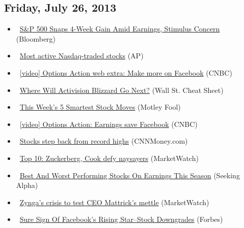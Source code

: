\documentclass[11pt,asymmetric]{article}
\begin{document}
\subsection*{Friday, July 26, 2013}
\begin{itemize}
\item\ \href{http://www.bloomberg.com/news/2013-07-26/s-p-500-snaps-4-week-gain-amid-earnings-stimulus-concern.html?cmpid=yhoo}{S\&P 500 Snaps 4-Week Gain Amid Earnings, Stimulus Concern} (Bloomberg)
\item\ \href{http://finance.yahoo.com/news/most-active-nasdaq-traded-stocks-174218975.html}{Most active Nasdaq-traded stocks} (AP)
\item\ \href{http://video.cnbc.com/gallery/?video=3000185984&__source=yahoo%7Cheadline%7Cquote%7Cvideo%7C&par=yahoo}{[video] Options Action web extra: Make more on Facebook} (CNBC)
\item\ \href{http://wallstcheatsheet.com/stocks/where-will-activision-blizzard-go-next.html/?ref=YF}{Where Will Activision Blizzard Go Next?} (Wall St. Cheat Sheet)
\item\ \href{http://www.fool.com/investing/general/2013/07/26/this-weeks-5-smartest-stock-moves.aspx?source=eogyholnk0000001}{This Week's 5 Smartest Stock Moves} (Motley Fool)
\item\ \href{http://video.cnbc.com/gallery/?video=3000186146&__source=yahoo%7Cheadline%7Cquote%7Cvideo%7C&par=yahoo}{[video] Options Action: Earnings save Facebook} (CNBC)
\item\ \href{http://money.cnn.com/2013/07/26/investing/stocks-markets/index.html?source=yahoo_quote}{Stocks step back from record highs} (CNNMoney.com)
\item\ \href{http://www.marketwatch.com/News/Story/Story.aspx?guid=63AD3ABA-F606-11E2-9F9D-002128040CF6&siteid=yhoof2}{Top 10: Zuckerberg, Cook defy naysayers} (MarketWatch)
\item\ \href{http://seekingalpha.com/article/1577482-best-and-worst-performing-stocks-on-earnings-this-season?source=yahoo}{Best And Worst Performing Stocks On Earnings This Season} (Seeking Alpha)
\item\ \href{http://www.marketwatch.com/News/Story/Story.aspx?guid=816354CE-F609-11E2-9F9D-002128040CF6&siteid=yhoof2}{Zynga’s crisis to test CEO Mattrick’s mettle} (MarketWatch)
\item\ \href{http://www.forbes.com/sites/roberthof/2013/07/26/sure-sign-of-facebooks-rising-star-stock-downgrades/?partner=yahootix}{Sure Sign Of Facebook's Rising Star--Stock Downgrades} (Forbes)

\end{itemize}
\end{document}
